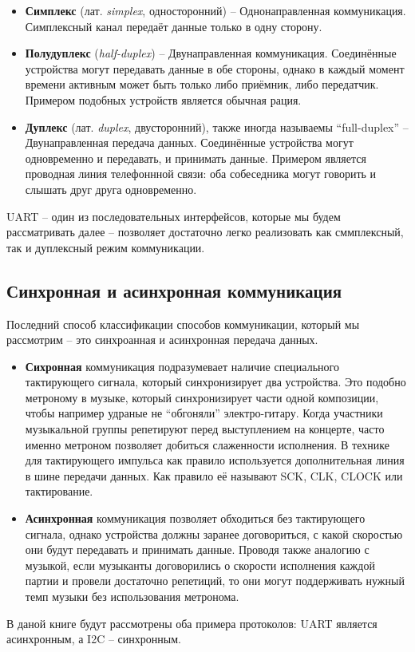 \documentclass[../sparc.tex]{subfiles}
\begin{document}
\begin{itemize}
\item \textbf{Симплекс} (лат. \emph{simplex}, односторонний) -- Однонаправленная
  коммуникация.  Симплексный канал передаёт данные только в одну сторону.
\item \textbf{Полудуплекс} (\emph{half-duplex}) -- Двунаправленная коммуникация.
  Соединённые устройства могут передавать данные в обе стороны, однако в каждый
  момент времени активным может быть только либо приёмник, либо передатчик.
  Примером подобных устройств является обычная рация.
\item \textbf{Дуплекс} (лат. \emph{duplex}, двусторонний), также иногда
  называемы ``full-duplex'' -- Двунаправленная передача данных.  Соединённые
  устройства могут одновременно и передавать, и принимать данные.  Примером
  является проводная линия телефоннной связи: оба собеседника могут говорить и
  слышать друг друга одновременно.
\end{itemize}

\gls{UART} -- один из последовательных интерфейсов, которые мы будем
рассматривать далее -- позволяет достаточно легко реализовать как сммплексный,
так и дуплексный режим коммуникации.

\subsection{Синхронная и асинхронная коммуникация}

Последний способ классификации способов коммуникации, который мы рассмотрим --
это синхроанная и асинхронная передача данных.

\begin{itemize}
\item \textbf{Сихронная} коммуникация подразумевает наличие специального
  тактирующего сигнала, который синхронизирует два устройства.  Это подобно
  метроному в музыке, который синхронизирует части одной композиции, чтобы
  например удраные не ``обгоняли'' электро-гитару.  Когда участники музыкальной
  группы репетируют перед выступлением на концерте, часто именно метроном
  позволяет добиться слаженности исполнения.  В технике для тактирующего
  импульса как правило используется дополнительная линия в шине передачи данных.
  Как правило её называют SCK, CLK, CLOCK или тактирование.
\item \textbf{Асинхронная} коммуникация позволяет обходиться без тактирующего
  сигнала, однако устройства должны заранее договориться, с какой скоростью они
  будут передавать и принимать данные.  Проводя также аналогию с музыкой, если
  музыканты договорились о скорости исполнения каждой партии и провели
  достаточно репетиций, то они могут поддерживать нужный темп музыки без
  использования метронома.
\end{itemize}

В даной книге будут рассмотрены оба примера протоколов: \gls{UART} является
асинхронным, а \gls{I2C} -- синхронным.

\end{document}
